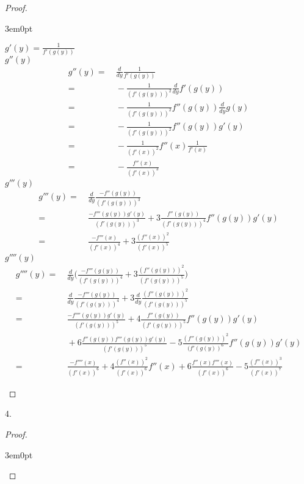 \documentclass[11pt]{article}
\newenvironment{myproof}
{\begin{proof} \begin{adjustwidth}{3em}{0pt}$ $\par\nobreak\ignorespaces}
{\end{adjustwidth} \end{proof}}
\begin{document}
\begin{flushleft}
\begin{myproof}
$g'(y) = \frac{1}{f'(g(y))}$ \\
\bigskip
$g''(y)$ \\
\begin{align*}
g''(y) = & \ \frac{d}{dy}\frac{1}{f'(g(y))} \\
= & \ -\frac{1}{(f'(g(y)))^2}\frac{d}{dy}f'(g(y)) \\
= & \ -\frac{1}{(f'(g(y)))^2}f''(g(y))\frac{d}{dy}g(y) \\
= & \ -\frac{1}{(f'(g(y)))^2}f''(g(y))g'(y) \\
= & \ -\frac{1}{(f'(x))^2}f''(x)\frac{1}{f'(x)} \\
= & \ -\frac{f''(x)}{(f'(x))^3}
\end{align*}
$g'''(y)$ \\
\bigskip
\begin{align*}
g'''(y) = & \ \frac{d}{dy}\frac{-f''(g(y))}{(f'(g(y)))^3} \\
= & \ \frac{-f'''(g(y))g'(y)}{(f'(g(y)))^3} +3 \frac{f''(g(y))}{(f'(g(y)))^4}f''(g(y))g'(y) \\
= & \ \frac{-f'''(x)}{(f'(x))^4} + 3\frac{(f''(x))^2}{(f'(x))^5}
\end{align*}
$g''''(y)$ \\
\bigskip
\begin{align*}
g''''(y) = & \ \frac{d}{dy} \Bigg( \frac{-f'''(g(y))}{(f'(g(y)))^4} + 3\frac{(f''(g(y)))^2}{(f'(g(y)))^5} \Bigg) \\
= & \ \frac{d}{dy}\frac{-f'''(g(y))}{(f'(g(y)))^4} + 3 \frac{d}{dy}\frac{(f''(g(y)))^2}{(f'(g(y)))^5} \\
= & \ \frac{-f''''(g(y))g'(y)}{(f'(g(y)))^5} +4 \frac{f''(g(y))}{(f'(g(y)))^5}f''(g(y))g'(y) \\
& \ +6\frac{f''(g(y))f'''(g(y))g'(y)}{(f'(g(y)))^5} -5 \frac{(f''(g(y)))^2}{(f'(g(y))^6}f''(g(y))g'(y) \\
= & \ \frac{-f''''(x)}{(f'(x))^6} +4 \frac{(f''(x))^2}{(f'(x))^6}f''(x) +6\frac{f''(x)f'''(x)}{(f'(x))^6} -5 \frac{(f''(x))^3}{(f'(x))^7}
\end{align*}


\end{myproof}

\newpage

4. 

\begin{myproof}


\end{myproof}
\end{flushleft}
\end{document}
